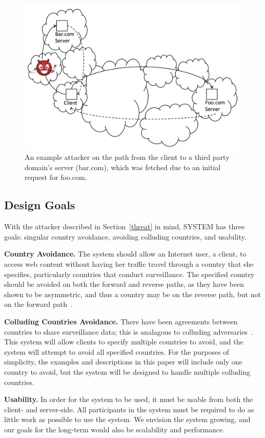 \begin{figure}
\centering
\includegraphics[width=.5\textwidth]{subsequent_request_attacker}
\caption{An example attacker on the path from the client to a third party domain's server (bar.com), which was fetched due to an initial request for foo.com.}
\label{fig:domains_attacker}
\end{figure}

\subsection{Design Goals}

With the attacker described in Section~\ref{threat} in mind, SYSTEM has three goals: singular country avoidance, avoiding colluding countries, and usability.  

{\bf Country Avoidance.}  The system should allow an Internet user, a client, to access web content without having her traffic travel through a country that she specifies, particularly countries that conduct surveillance.  The specified country should be avoided on both the forward and reverse paths, as they have been shown to be asymmetric, and thus a country may be on the reverse path, but not on the forward path~\cite{he2005routing}.  

{\bf Colluding Countries Avoidance.}  There have been agreements between countries to share surveillance data; this is analagous to colluding adversaries~\cite{fiveeyes}.  This system will allow clients to specify multiple countries to avoid, and the system will attempt to avoid all specified countries.  For the purposes of simplicity, the examples and descriptions in this paper will include only one country to avoid, but the system will be designed to handle multiple colluding countries.

{\bf Usability.} In order for the system to be used, it must be usable from both the client- and server-side.  All participants in the system must be required to do as little work as possible to use the system.  We envision the system growing, and our goals for the long-term would also be scalability and performance.

